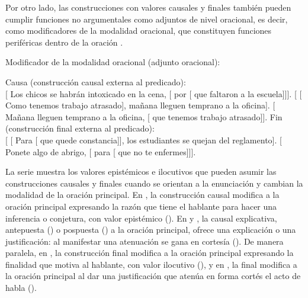 Por otro lado, las construcciones con valores causales y finales también pueden
cumplir funciones no argumentales como adjuntos de nivel oracional, es decir,
como modificadores de la modalidad oracional, que constituyen funciones
periféricas dentro de la oración .

\begin{exe}
  \ex\label{ex:13-mmo} Modificador de la modalidad oracional (adjunto
      oracional):
    \begin{xlist}
      \ex\label{ex:13-mmo-a} Causa (construcción causal externa al predicado):\\
          {}[ Los chicos se habrán intoxicado en la cena, [
          por [ que faltaron a la escuela]]].
      \ex\label{ex:13-mmo-b} {}[ [ Como tenemos trabajo
          atrasado], mañana lleguen temprano a la oficina].
      \ex\label{ex:13-mmo-c} {}[ Mañana lleguen temprano a la oficina,
          [ que tenemos trabajo atrasado]].
      \ex\label{ex:13-mmo-d} Fin (construcción final externa al predicado):\\
          {}[ [ Para [ que quede constancia]], los
          estudiantes se quejan del reglamento].
      \ex\label{ex:13-mmo-e} {}[ Ponete algo de abrigo, [ para
          [ que no te enfermes]]].
    \end{xlist}
\end{exe}

La serie  muestra los valores epistémicos e ilocutivos que
pueden asumir las construcciones causales y finales cuando se orientan a la
enunciación y cambian la modalidad de la oración principal. En
, la construcción causal modifica a la oración principal
expresando la razón que tiene el hablante para hacer una inferencia o conjetura,
con valor epistémico (). En  y
, la causal explicativa, antepuesta () o
pospuesta () a la oración principal, ofrece una explicación o una
justificación: al manifestar una atenuación se gana en cortesía (). De manera paralela, en , la construcción final
modifica a la oración principal expresando la finalidad que motiva al hablante,
con valor ilocutivo (), y en , la final
modifica a la oración principal al dar una justificación que atenúa en forma
cortés el acto de habla ().

